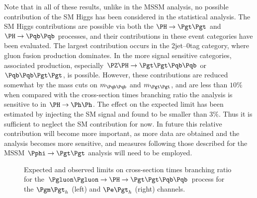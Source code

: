 Note that in all of these results, unlike in the \ac{MSSM} analysis, no possible
contribution of the \ac{SM} Higgs has been considered in the statistical
analysis. The \ac{SM} Higgs contributions are possible via both the $\PH\to\Pgt\Pgt$
and $\PH\to\Pqb\Pqb$ processes, and their contributions in these event
categories have been evaluated. The largest contribution occurs in the
2jet--0tag category, where gluon fusion production dominates. In the more signal
sensitive categories, associated production, especially
$\PZ\PH\to\Pgt\Pgt\Pqb\Pqb$ or $\Pqb\Pqb\Pgt\Pgt$, is possible. 
However, these contributions are
reduced somewhat by the mass cuts on $m_{\Pqb\Pqb}$ and $m_{\Pgt\Pgt}$, and 
are less than $10\%$ when compared with the cross-section times branching ratio
the analysis is sensitive to in $\PH\to\Ph\Ph$. The effect on the expected limit
has been estimated by injecting the \ac{SM} signal and found to be smaller than
$3\%$. Thus it is sufficient to neglect the \ac{SM} contribution for now. In
future this relative contribution will become more important, as more data are
obtained and the analysis becomes more sensitive, and measures following those
described for the \ac{MSSM} $\Pphi\to\Pgt\Pgt$ analysis will need to be
employed. 

\begin{figure}
\begin{center}

\end{center}
\caption{
Expected and observed limits on cross-section times branching ratio for the
$\Pgluon\Pgluon\to\PH\to\Pgt\Pgt\Pqb\Pqb$ process for the $\mutau$ (left) and
$\etau$ (right) channels.}
\label{fig:Hhhlimits}
\end{figure} 

